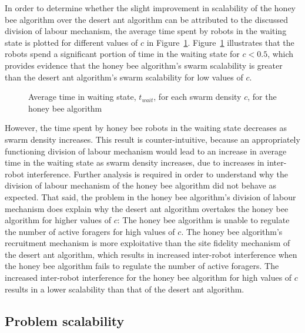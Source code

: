In order to determine whether the slight improvement in scalability of the honey bee algorithm over the desert ant algorithm can be attributed to the discussed division of labour mechanism, the average time spent by robots in the waiting state is plotted for different values of $c$ in Figure~\ref{fig:swarmscalabilitywaitingtime}. Figure~\ref{fig:swarmscalabilitywaitingtime} illustrates that the robots spend a significant portion of time in the waiting state for $c < 0.5$, which provides evidence that the honey bee algorithm's swarm scalability is greater than the desert ant algorithm's swarm scalability for low values of $c$.

\begin{figure}[!htbp]
\centering
\small
\resizebox{\textwidth}{!}{}
\caption{Average time in waiting state, $t_{wait}$, for each swarm density $c$, for the honey bee algorithm}
\label{fig:swarmscalabilitywaitingtime}
\end{figure}
However, the time spent by honey bee robots in the waiting state decreases as swarm density increases. This result is counter-intuitive, because an appropriately functioning division of labour mechanism would lead to an increase in average time in the waiting state as swarm density increases, due to increases in inter-robot interference. Further analysis is required in order to understand why the division of labour mechanism of the honey bee algorithm did not behave as expected. That said, the problem in the honey bee algorithm's division of labour mechanism does explain why the desert ant algorithm overtakes the honey bee algorithm for higher values of $c$: The honey bee algorithm is unable to regulate the number of active foragers for high values of $c$. The honey bee algorithm's recruitment mechanism is more exploitative than the site fidelity mechanism of the desert ant algorithm, which results in increased inter-robot interference when the honey bee algorithm fails to regulate the number of active foragers. The increased inter-robot interference for the honey bee algorithm for high values of $c$ results in a lower scalability than that of the desert ant algorithm.

\subsection{Problem scalability}
\label{results:problemscalability}

